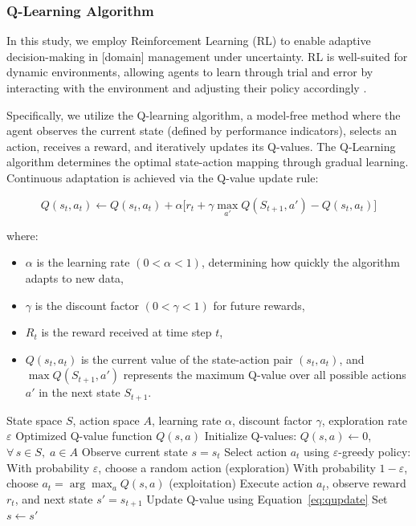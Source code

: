 \documentclass[10pt,twocolumn]{article}
\begin{document}
\subsubsection{Q-Learning Algorithm}
In this study, we employ Reinforcement Learning (RL) to enable
adaptive decision-making in [domain] management under uncertainty.
RL is well-suited for dynamic environments, allowing agents to
learn through trial and error by interacting with the environment
and adjusting their policy accordingly \citep{Sutton1998}.

Specifically, we utilize the Q-learning algorithm, a model-free
method where the agent observes the current state (defined by
performance indicators), selects an action, receives a reward, and
iteratively updates its Q-values. The Q-Learning algorithm
determines the optimal state-action mapping through gradual
learning. Continuous adaptation is achieved via the Q-value update
rule:

\begin{equation}
  Q(s_t, a_t) \leftarrow Q(s_t, a_t) +
  \alpha \bigl[ r_t + \gamma \max_{a'} Q(S_{t+1}, a') - Q(s_t, a_t) \bigr]
  \label{eq:qupdate}
\end{equation}

\noindent where:
\begin{itemize}
  \item $\alpha$ is the learning rate $(0 < \alpha < 1)$,
        determining how quickly the algorithm adapts to new data,
  \item $\gamma$ is the discount factor $(0 < \gamma < 1)$ for
        future rewards,
  \item $R_t$ is the reward received at time step $t$,
  \item $Q(s_t, a_t)$ is the current value of the state-action
        pair $(s_t, a_t)$, and $\max Q(S_{t+1}, a')$ represents the
        maximum Q-value over all possible actions $a'$ in the next
        state $S_{t+1}$.
\end{itemize}

\begin{algorithm}[H]
\caption{Q-Learning Approach}
\label{alg:qlearning}
\begin{algorithmic}[1]
  \REQUIRE State space $S$, action space $A$, learning rate
           $\alpha$, discount factor $\gamma$, exploration rate
           $\varepsilon$
  \ENSURE  Optimized Q-value function $Q(s,a)$
  \STATE Initialize Q-values: $Q(s,a)\leftarrow 0$,
         $\forall\, s\in S,\; a\in A$
  \REPEAT
    \STATE Observe current state $s = s_t$
    \STATE Select action $a_t$ using $\varepsilon$-greedy policy:
    \STATE \quad With probability $\varepsilon$, choose a random
           action (exploration)
    \STATE \quad With probability $1-\varepsilon$, choose
           $a_t = \arg\max_a Q(s,a)$ (exploitation)
    \STATE Execute action $a_t$, observe reward $r_t$, and next
           state $s' = s_{t+1}$
    \STATE Update Q-value using Equation~\eqref{eq:qupdate}
    \STATE Set $s \leftarrow s'$
\end{algorithmic}
\end{algorithm}
\end{document}
